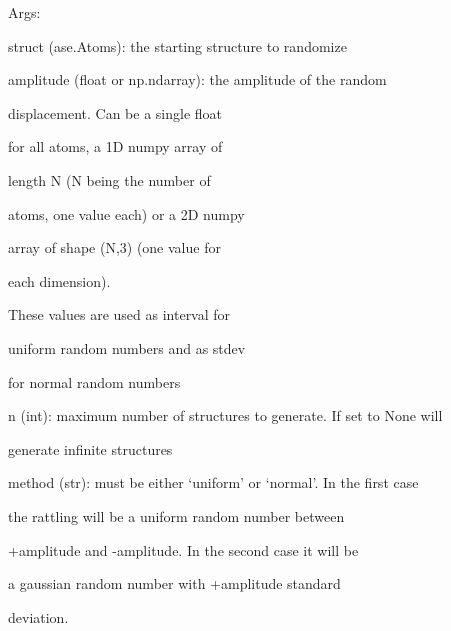 \documentclass[letterpaper,10pt,english]{sphinxmanual}
\begin{document}
\begin{fulllineitems}
\begin{DUlineblock}{0em}
\item[] Args:
\item[]
\begin{DUlineblock}{\DUlineblockindent}
\item[] struct (ase.Atoms): the starting structure to randomize
\item[] amplitude (float or np.ndarray): the amplitude of the random
\item[]
\begin{DUlineblock}{\DUlineblockindent}
\item[] displacement. Can be a single float
\item[] for all atoms, a 1D numpy array of
\item[] length N (N being the number of
\item[] atoms, one value each) or a 2D numpy
\item[] array of shape (N,3) (one value for
\item[] each dimension).
\item[] These values are used as interval for
\item[] uniform random numbers and as stdev
\item[] for normal random numbers
\end{DUlineblock}
\item[] n (int): maximum number of structures to generate. If set to None will
\item[]
\begin{DUlineblock}{\DUlineblockindent}
\item[] generate infinite structures
\end{DUlineblock}
\item[] method (str): must be either `uniform' or `normal'. In the first case
\item[]
\begin{DUlineblock}{\DUlineblockindent}
\item[] the rattling will be a uniform random number between
\item[] +amplitude and -amplitude. In the second case it will be
\item[] a gaussian random number with +amplitude standard
\item[] deviation.
\end{DUlineblock}
\end{DUlineblock}
\end{DUlineblock}


\end{fulllineitems}
\end{document}
